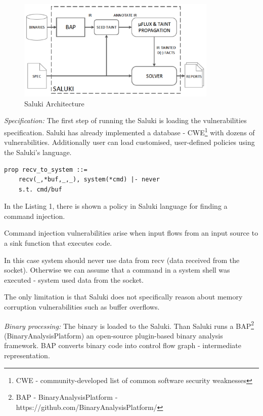 \documentclass[a4paper, 12pt, journal, onecolumn]{IEEEtran}
\begin{document}
\begin{figure}[ht]
    \centering
    \captionsetup{justification=centering}
    \includegraphics[width=0.85\textwidth]{saluki.png}
    \caption{Saluki Architecture \cite{saluki}}
    \label{fig:saluki}
\end{figure}

\textit{Specification: } The first step of running the Saluki is loading the vulnerabilities specification. Saluki has already implemented a database - CWE\footnote{CWE - community-developed list of common software security weaknesses} with dozens of vulnerabilities. Additionally user can load customised, user-defined policies using the Saluki's language.\\


\begin{lstlisting}[label=saluki-code,caption=Command injection example]
    prop recv_to_system ::=
    recv(_,*buf,_,_), system(*cmd) |- never
    s.t. cmd/buf
\end{lstlisting}

In the Listing 1, there is shown a policy in Saluki language for finding a command injection. 

Command injection vulnerabilities arise when input flows from an input source to a sink function that executes code. 

In this case system should never use data from recv (data received from the socket). Otherwise we can assume that a command in a system shell was executed - system used data from the socket. 

The only limitation is that Saluki does not specifically reason about memory corruption vulnerabilities such as buffer overflows.

\bigskip

\textit{Binary processing:} The binary is loaded to the Saluki. Than Saluki runs a BAP\footnote{BAP - BinaryAnalysisPlatform - https://github.com/BinaryAnalysisPlatform/} (BinaryAnalysisPlatform) an open-source plugin-based binary analysis framework. BAP converts binary code into control flow graph - intermediate representation.\cite{a8} 
\bigskip
\end{document}
